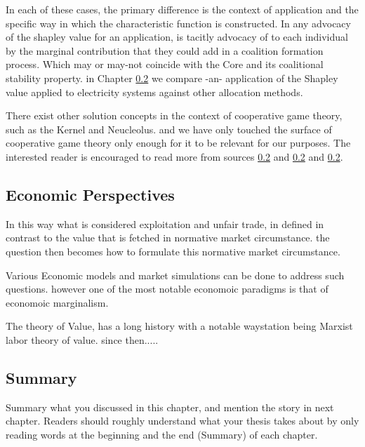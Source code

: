 


In each of these cases, the primary difference is the context of application and the specific way in which the characteristic function is constructed.
In any advocacy of the shapley value for an application, is tacitly advocacy of to each individual by the marginal contribution that they could add in a coalition formation process.
Which may or may-not coincide with the Core and its coalitional stability property.
in Chapter \ref{} we compare -an- application of the Shapley value applied to electricity systems against other allocation methods.

There exist other solution concepts in the context of cooperative game theory, such as the Kernel and Neucleolus. and we have only touched the surface of cooperative game theory only enough for it to be relevant for our purposes.
The interested reader is encouraged to read more from sources \ref{} and \ref{} and \ref{}.

\subsection{Economic Perspectives}

In this way what is considered exploitation and unfair trade, in defined in contrast to the value that is fetched in normative market circumstance.
the question then becomes how to formulate this normative market circumstance.

Various Economic models and market simulations can be done to address such questions.
however one of the most notable economoic paradigms is that of economoic marginalism.

The theory of Value, has a long history with a notable waystation being Marxist labor theory of value. since then.....

\subsection{Summary}
Summary what you discussed in this chapter, and mention the story in next
chapter. Readers should roughly understand what your thesis takes about by only reading
words at the beginning and the end (Summary) of each chapter.




